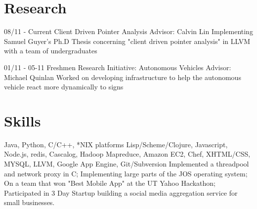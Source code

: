 \documentclass[11pt,letter,sans]{moderncv}
\begin{document}
\section{Research}
\cventry
{08/11 - Current}
{Client Driven Pointer Analysis}
{Advisor: Calvin Lin}
{}
{}
{Implementing Samuel Guyer's Ph.D Thesis concerning "client driven pointer
analysis" in LLVM with a team of undergraduates}

\cventry
{01/11 - 05-11}
{Freshmen Research Initiative: Autonomous Vehicles}
{Advisor: Michael Quinlan}
{}
{}
{Worked on developing infrastructure to help the autonomous vehicle react more
dynamically to signs} 

\section{Skills}
{Java, Python, C/C++, *NIX platforms}
{Lisp/Scheme/Clojure, Javascript, Node.js, redis, Cascalog, Hadoop Mapreduce,
Amazon EC2, Chef, XHTML/CSS, MYSQL, LLVM, Google App Engine, Git/Subversion }
{Implemented a threadpool and network proxy in C; Implementing large parts of
  the JOS operating system; On a team that won "Best Mobile App" at the UT
  Yahoo Hackathon; Participated in 3 Day Startup building a social media
aggregation service for small businesses.}
\end{document}
